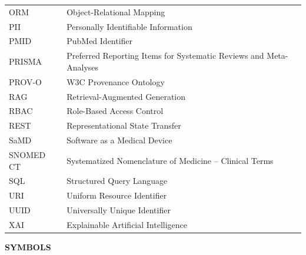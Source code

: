 \documentclass[12pt,a4paper]{report}
\begin{document}
\begin{table}[H]
\begin{tabularx}{\textwidth}{lX}
ORM & Object-Relational Mapping \\
PII & Personally Identifiable Information \\
PMID & PubMed Identifier \\
PRISMA & Preferred Reporting Items for Systematic Reviews and Meta-Analyses \\
PROV-O & W3C Provenance Ontology \\
RAG & Retrieval-Augmented Generation \\
RBAC & Role-Based Access Control \\
REST & Representational State Transfer \\
SaMD & Software as a Medical Device \\
SNOMED CT & Systematized Nomenclature of Medicine -- Clinical Terms \\
SQL & Structured Query Language \\
URI & Uniform Resource Identifier \\
UUID & Universally Unique Identifier \\
XAI & Explainable Artificial Intelligence \\
\bottomrule
\end{tabularx}
\end{table}

\newpage
\begin{center}
    \textbf{\Large SYMBOLS}\\[0.8cm]
\end{center}
\end{document}
